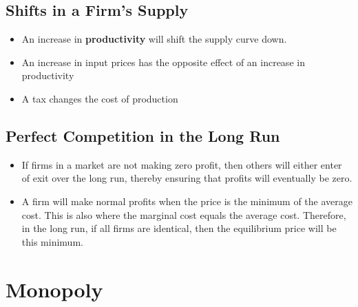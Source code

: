 \documentclass[a4paper]{article}
\begin{document}
\subsection{Shifts in a Firm's Supply}
\begin{itemize}
    \item An increase in \textbf{productivity} will shift the supply curve down.
    \item An increase in input prices has the opposite effect of an increase in productivity
    \item A tax changes the cost of production
\end{itemize}

\subsection{Perfect Competition in the Long Run}
\begin{itemize}
    \item If firms in a market are not making zero profit, then others will either enter of exit over the long run, thereby ensuring that profits will eventually be zero. 
    \item A firm will make normal profits when the price is the minimum of the average cost. This is also where the marginal cost equals the average cost. Therefore, in the long run, if all firms are identical, then the equilibrium price will be this minimum.
\end{itemize}

\section{Monopoly}
\end{document}
